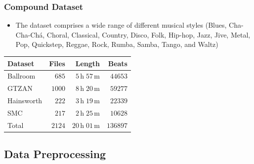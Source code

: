 \documentclass{beamer}
\begin{document}
\begin{frame}
\frametitle{Compound Dataset}
\begin{itemize}
\item The dataset comprises a wide range of different musical styles
(Blues, Cha-Cha-Chá, Choral, Classical, Country, Disco, Folk, Hip-hop, Jazz, Jive, Metal, Pop, Quickstep, Reggae, Rock, Rumba, Samba, Tango, and Waltz)
\end{itemize}
\begin{table}[htbp]
\centering
\footnotesize
\begin{tabular}{lrrr}
\hline
\hline
\textbf{Dataset} & \textbf{Files} & \textbf{Length} & \textbf{Beats} \\
\hline
Ballroom \cite{Gouyon2006b, Krebs2013} & $685$ & $5\,\text{h} \;57\,\text{m}$ & $\num{44653}$\\
GTZAN \cite{Tzanetakis2002b, marchand2015swing} & $1000$ & $8\,\text{h}\;20\,\text{m}$ & $\num{59277}$\\
Hainsworth \cite{Hainsworth2004} & $222$ & $3\,\text{h}\;19\,\text{m}$ & $\num{22339}$\\
SMC \cite{Holzapfel2012} & $217$ & $2\,\text{h}\;25\,\text{m}$ & $\num{10628}$\\    
\hline
Total & $2124$ & $ 20\,\text{h}\; 01\,\text{m}$ & $\num{136897}$\\  
\hline
\hline
\end{tabular}
\end{table}  

\end{frame}


\subsection{Data Preprocessing}
\end{document}
